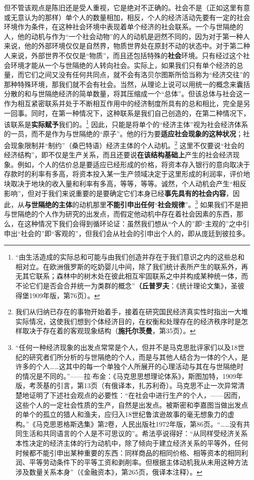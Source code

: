 \documentclass[fontset=fandol, a4paper, 12pt, openright]{ctexbook}
\begin{document}
但不管该观点是陈旧还是受人重视，它是绝对不正确的。社会不是（正如这里有意或无意认为的那样）单个人的数量相加，相反，个人的经济活动先要有一定的社会环境作为条件，在这种社会环境中表现着单个经济的社会联系。一个与世隔绝的人，他的动机与作为“一个社会动物”的人的动机是迥然不同的，因为对于第一种人来说，他的外部环境仅仅是自然界，物质世界处在原封不动的状态中。对于第二种人来说，外部世界不仅仅是“物质”，而且还包括特殊的\textbf{社会}环境。只有经过这个社会环境才能从一个与世隔绝的人转向社会。实际上，如果我们只有单个经济的总量，而它们之间又没有任何共同点，就不会有洛贝尔图斯所恰当称为“经济交往”的那种特殊环境，那我们就不会有社会。当然，从理论上说可以用统一的概念来囊括分散的和与世隔绝经济的简单数量，将其压缩成一个“总体”。但该总体与社会这一作为相互紧密联系并处于不断相互作用中的经济制度所具有的总和相比，完全是另一回事。同时，在第一种情况下，这种联系是我们自己创造的，在第二种情况下，该联系是\textbf{实际赋予}我们的。\footnote{“由生活造成的实际总和可能与由我们创造并存在于我们意识之内的这些总和相对立。在欧洲俄罗斯的吃奶婴儿中间，除了我们统计表所产生的联系外，再无其它联系；森林中的树木处在彼此相互牢固联系之中并构成某种统一体，而不论它们是否会合并统一为类群的概念”\textbf{（丘普罗夫}：《统计理论文集》，圣彼得堡1909年版，第76页）。} 因此，只能是将单个的“经济主体”视为社会经济体系的一员，而不是作为与世隔绝的“原子”。他的行为要\textbf{适应社会现象的这种状况}；社会现象限制并“制约”（桑巴特语）经济主体的个人动机。\footnote{我们从归纳已存在的事物开始着手，接着在研究国民经济真实性时指出一大堆实际情况，这使我们想到个体经济目的，在权衡和处理存在的经济秩序时是怎样取决于存在着的客观现象结构（\textbf{施托尔茨曼}，第35页）。} 这里不仅要说“社会的经济结构”，即不仅是生产关系，而且还要说\textbf{在该结构基础上}产生的社会经济现象。例如，个人的估价总是要适应已经形成的价格，将资本存入银行的意向取决于存款时的利率有多高，将资本投入某一生产领域决定于这里形成的利润率，评价地块取决于地块的收入量和利率有多高，等等，等等。诚然，个人动机会产生“相反影响”，但对于我们来说重要的是要确定它们本身已经\textbf{事先具有的社会内容}，因此，从\textbf{与世隔绝的主体}的动机那里\textbf{不能引申出任何}“\textbf{社会规律}”。\footnote{“任何一种经济现象的出发点常常是个人，但并不是马克思批评家们以及18世纪的研究者们所分析的与世隔绝的个人，而是与其他人结合为一体的个人，是许多的个人……这其中的每一个单独个人所展开的心理活动与其在与世隔绝时的情况是不同的。”——拉$\cdot$布金：《马克思思想理论体系》，斯图加特，1909年版，考茨基的引言，第13页（有俄译本，扎苏利奇）。马克思不止一次异常清楚地证明了下述社会观点的必要性：“在社会中进行生产的个人，——因而，这些个人的一定社会性质的生产，自然是出发点。被斯密和李嘉图当做出发点的单个的孤立的猎人和渔夫，应归入18世纪鲁滨逊故事的毫无想象力的虚构。”《马克思恩格斯选集》第2卷，人民出版社1972年版，第86页。“……没有共同生活和共同语言的个人是不可思议的”。希法亭说得好：“从同样受经济关系本性决定的经济主体的行为动机中，除了倾向于建立经济关系的平等外，任何时候都不能引申出某种重要的东西：同样商品的相同价格、相等资本的相同利润、平等劳动条件下的平等工资和剥削率。但根据主体动机我从未用这种方法涉及数量关系本身”（《金融资本》，第265页，俄译本注释）。} 如果我们不是把与世隔绝的个人作为研究的出发点，而假定他动机中存在着社会因素的东西，那么，在这种情况下我们会得到循环论证：虽然我们想从“个人的”即“主观的”之中引申出“社会的”即“客观的”，但我们会从社会的引申出个人的，即从庞廷到彼拉多。
\end{document}
